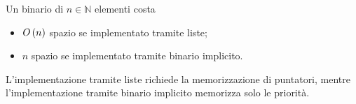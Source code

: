 \begin{Theorem}
  Un  binario di $n \in \mathbb{N}$ elementi costa
  \begin{itemize}
    \item $O \left ( n \right )$ spazio se implementato tramite liste;
    \item $n$ spazio se implementato tramite  binario implicito.
  \end{itemize}
\end{Theorem}
\Proof L'implementazione tramite liste richiede la memorizzazione di puntatori,
mentre l'implementazione tramite  binario implicito memorizza solo
le priorit\`a. \EndProof
